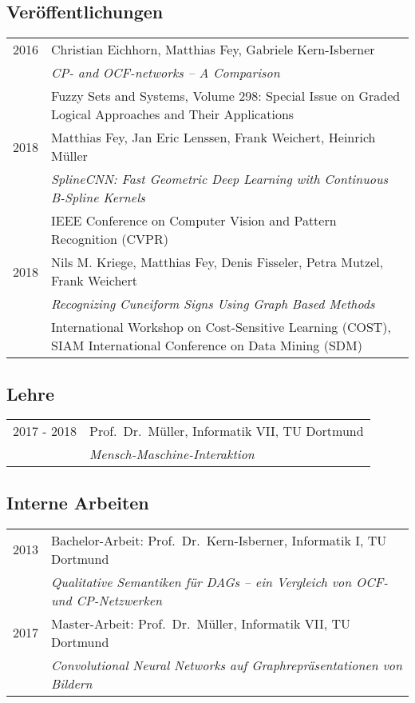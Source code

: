 \documentclass[10pt]{scrartcl}
\begin{document}
\subsection*{Veröffentlichungen}

\begin{tabular}{p{3cm}p{13cm}}
2016 & Christian Eichhorn, Matthias Fey, Gabriele Kern-Isberner\\
     & \textit{CP- and OCF-networks – A Comparison}\\
     & Fuzzy Sets and Systems, Volume 298: Special Issue on Graded Logical Approaches and Their Applications\\
2018 & Matthias Fey, Jan Eric Lenssen, Frank Weichert, Heinrich Müller\\
     & \textit{SplineCNN: Fast Geometric Deep Learning with Continuous B-Spline Kernels}\\
     & IEEE Conference on Computer Vision and Pattern Recognition (CVPR)\\
2018 & Nils M. Kriege, Matthias Fey, Denis Fisseler, Petra Mutzel, Frank Weichert\\
     & \textit{Recognizing Cuneiform Signs Using Graph Based Methods}\\
     & International Workshop on Cost-Sensitive Learning (COST), SIAM International Conference on Data Mining (SDM)\\
\end{tabular}

\subsection*{Lehre}

\begin{tabular}{p{3cm}p{13cm}}
2017 - 2018 & Prof.~Dr.~Müller, Informatik VII, TU Dortmund\\
            & \textit{Mensch-Maschine-Interaktion}\\
\end{tabular}

\subsection*{Interne Arbeiten}

\begin{tabular}{p{3cm}p{13cm}}
2013 & Bachelor-Arbeit: Prof.~Dr.~Kern-Isberner, Informatik I, TU Dortmund\\
     & \textit{Qualitative Semantiken für DAGs – ein Vergleich von OCF- und CP-Netzwerken}\\
2017 & Master-Arbeit: Prof.~Dr.~Müller, Informatik VII, TU Dortmund\\
     & \textit{Convolutional Neural Networks auf Graphrepräsentationen von Bildern}\\
\end{tabular}
\end{document}
